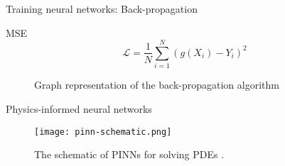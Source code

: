 \begin{frame}[fragile]{Training neural networks: Back-propagation}
    \begin{block}{\gls{MSE}}
        \begin{equation*}
            \mathcal{L} = \frac{1}{N} \sum_{i=1}^N (g(X_i) - Y_i)^2
        \end{equation*}
    \end{block}
    \begin{figure}[h]
        \centering
        \caption{Graph representation of the back-propagation algorithm}
        \label{fig:multi-layer-perceptron-backpropagation}
    \end{figure}
\end{frame}

\begin{frame}{Physics-informed neural networks}
    \begin{figure}[h]
        \centering
        \texttt{[image: pinn-schematic.png]}
        \caption{The schematic of \glspl{PINN} for solving \glspl{PDE} \cite{guoSolvingPartialDifferential2020}.}
        \label{fig:pinn-schematic}
    \end{figure}
\end{frame}

